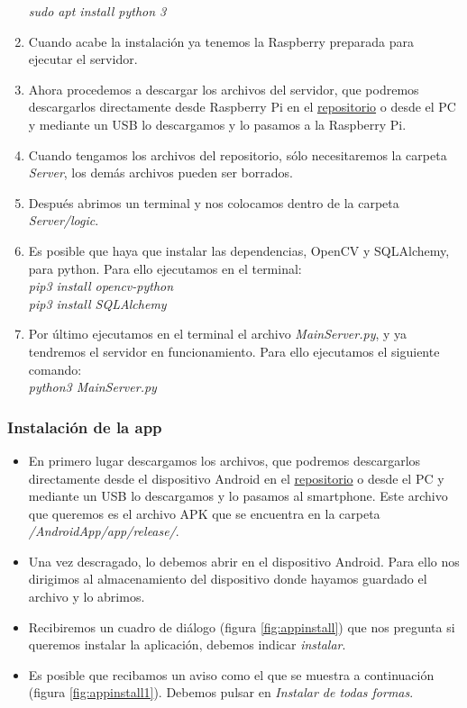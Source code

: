 \begin{enumerate}
	\textit{sudo apt install python 3}
\item
	Cuando acabe la instalación ya tenemos la Raspberry preparada para ejecutar el servidor.
\item
	Ahora procedemos a descargar los archivos del servidor, que podremos descargarlos directamente desde Raspberry Pi en el \href{https://github.com/fmv1001/DomoCamera}{repositorio} o desde el PC y mediante un USB lo descargamos y lo pasamos a la Raspberry Pi.
\item
	Cuando tengamos los archivos del repositorio, sólo necesitaremos la carpeta \textit{Server}, los demás archivos pueden ser borrados. \label{paso10}
\item
	Después abrimos un terminal y nos colocamos dentro de la carpeta \textit{Server/logic}.
\item
	Es posible que haya que instalar las dependencias, OpenCV y SQLAlchemy, para python. Para ello ejecutamos en el terminal:\\
	\textit{pip3 install opencv-python}\\
	\textit{pip3 install SQLAlchemy}
\item
	Por último ejecutamos en el terminal el archivo \textit{MainServer.py}, y ya tendremos el servidor en funcionamiento. Para ello ejecutamos el siguiente comando:\\
	\textit{python3 MainServer.py}\\

\end{enumerate}

\subsubsection{Instalación de la app}

\begin{itemize}
\item
	En primero lugar descargamos los archivos, que podremos descargarlos directamente desde el dispositivo Android en el \href{https://github.com/fmv1001/DomoCamera}{repositorio} o desde el PC y mediante un USB lo descargamos y lo pasamos al smartphone.
	Este archivo que queremos es el archivo APK que se encuentra en la carpeta \textit{/AndroidApp/app/release/}.
\item
	Una vez descragado, lo debemos abrir en el dispositivo Android.
	Para ello nos dirigimos al almacenamiento del dispositivo donde hayamos guardado el archivo y lo abrimos.
\item
	Recibiremos un cuadro de diálogo (figura \ref{fig:appinstall}) que nos pregunta si queremos instalar la aplicación, debemos indicar \textit{instalar}.
\item
	Es posible que recibamos un aviso como el que se muestra a continuación (figura \ref{fig:appinstall1}).
	Debemos pulsar en \textit{Instalar de todas formas}.
\end{itemize}




